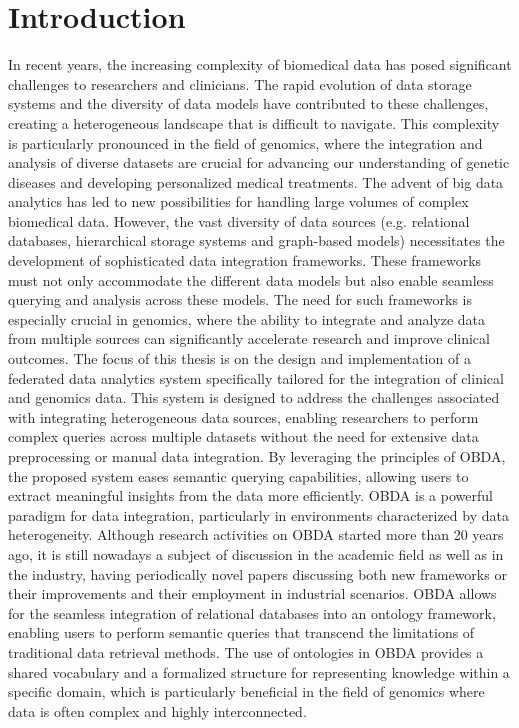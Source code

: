 
\chapter{Introduction}
\label{chp:intro}

In recent years, the increasing complexity of biomedical data has posed significant challenges to researchers and clinicians. The rapid evolution of data storage systems and the diversity of data models have contributed to these challenges, creating a heterogeneous landscape that is difficult to navigate. This complexity is particularly pronounced in the field of genomics, where the integration and analysis of diverse datasets are crucial for advancing our understanding of genetic diseases and developing personalized medical treatments.
The advent of big data analytics has led to new possibilities for handling large volumes of complex biomedical data. However, the vast diversity of data sources (e.g. relational databases, hierarchical storage systems and graph-based models) necessitates the development of sophisticated data integration frameworks. These frameworks must not only accommodate the different data models but also enable seamless querying and analysis across these models. The need for such frameworks is especially crucial in genomics, where the ability to integrate and analyze data from multiple sources can significantly accelerate research and improve clinical outcomes.
The focus of this thesis is on the design and implementation of a federated data analytics system specifically tailored for the integration of clinical and genomics data. This system is designed to address the challenges associated with integrating heterogeneous data sources, enabling researchers to perform complex queries across multiple datasets without the need for extensive data preprocessing or manual data integration. By leveraging the principles of \ac{OBDA}, the proposed system eases semantic querying capabilities, allowing users to extract meaningful insights from the data more efficiently.
\ac{OBDA} is a powerful paradigm for data integration, particularly in environments characterized by data heterogeneity. Although research activities on \ac{OBDA} started more than 20 years ago, it is still nowadays a subject of discussion in the academic field as well as in the industry, having periodically novel papers discussing both new frameworks or their improvements and their employment in industrial scenarios. \ac{OBDA} allows for the seamless integration of relational databases into an ontology framework, enabling users to perform semantic queries that transcend the limitations of traditional data retrieval methods. The use of ontologies in \ac{OBDA} provides a shared vocabulary and a formalized structure for representing knowledge within a specific domain, which is particularly beneficial in the field of genomics where data is often complex and highly interconnected.
